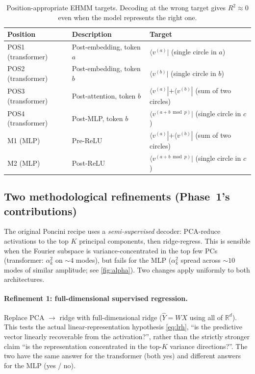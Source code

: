 \documentclass[11pt,a4paper]{article}
\begin{document}
\begin{table}[ht]
\centering
\caption{Position-appropriate EHMM targets. Decoding at the wrong target gives $R^2 \approx 0$ even when the model represents the right one.}
\label{tab:targets}
\begin{tabular}{lll}
\toprule
\textbf{Position} & \textbf{Description} & \textbf{Target} \\
\midrule
POS1 (transformer) & Post-embedding, token $a$ & $\langle v^{(a)} |$ (single circle in $a$) \\
POS2 (transformer) & Post-embedding, token $b$ & $\langle v^{(b)} |$ (single circle in $b$) \\
POS3 (transformer) & Post-attention, token $b$ & $\langle v^{(a)} | + \langle v^{(b)} |$ (sum of two circles) \\
POS4 (transformer) & Post-MLP, token $b$ & $\langle v^{(a+b \bmod p)} |$ (single circle in $c$) \\
\midrule
M1 (MLP) & Pre-ReLU & $\langle v^{(a)} | + \langle v^{(b)} |$ (sum of two circles) \\
M2 (MLP) & Post-ReLU & $\langle v^{(a+b \bmod p)} |$ (single circle in $c$) \\
\bottomrule
\end{tabular}
\end{table}

\subsection{Two methodological refinements (Phase~1's contributions)}\label{sec:refinements}

The original Poncini recipe uses a \emph{semi-supervised} decoder: PCA-reduce activations to the top $K$ principal components, then ridge-regress. This is sensible when the Fourier subspace is variance-concentrated in the top few PCs (transformer: $\alpha_k^2$ on $\sim 4$ modes), but fails for the MLP ($\alpha_k^2$ spread across ${\sim}10$ modes of similar amplitude; see \cref{fig:alpha}). Two changes apply uniformly to both architectures.

\paragraph{Refinement 1: full-dimensional supervised regression.} Replace PCA $\to$ ridge with full-dimensional ridge ($\hat{Y} = W X$ using all of $\mathbb{R}^d$). This tests the actual linear-representation hypothesis \eqref{eq:lrh}, ``is the predictive vector linearly recoverable from the activation?'', rather than the strictly stronger claim ``is the representation concentrated in the top-$K$ variance directions?''. The two have the same answer for the transformer (both yes) and different answers for the MLP (yes / no).
\end{document}
